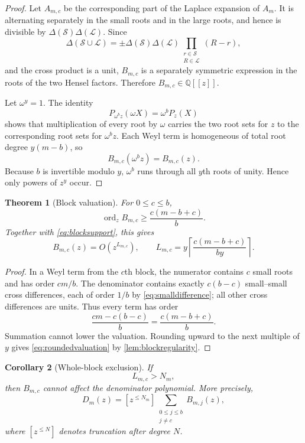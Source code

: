 \documentclass[11pt]{amsart}
\newtheorem{theorem}{Theorem}[section]
\newtheorem{corollary}[theorem]{Corollary}
\theoremstyle{remark}
\newcommand{\Q}{\mathbb{Q}}
\newcommand{\cS}{\mathcal{S}}
\newcommand{\cL}{\mathcal{L}}
\newcommand{\ord}{\operatorname{ord}}
\begin{document}
\begin{proof}
Let $A_{m,c}$ be the corresponding part of the Laplace expansion of $A_m$.  It is alternating separately in the small roots and in the large roots, and hence is divisible by $\Delta(\cS)\Delta(\cL)$.  Since
\[
 \Delta(\cS\cup\cL)
 =\pm\Delta(\cS)\Delta(\cL)
   \prod_{\substack{r\in\cS\\R\in\cL}}(R-r),
\]
and the cross product is a unit, $B_{m,c}$ is a separately symmetric expression in the roots of the two Hensel factors.  Therefore $B_{m,c}\in\Q[[z]]$.

Let $\omega^y=1$.  The identity
\[
    P_{\omega^b z}(\omega X)=\omega^bP_z(X)
\]
shows that multiplication of every root by $\omega$ carries the two root sets for $z$ to the corresponding root sets for $\omega^b z$.  Each Weyl term is homogeneous of total root degree $y(m-b)$, so
\[
    B_{m,c}(\omega^b z)=B_{m,c}(z).
\]
Because $b$ is invertible modulo $y$, $\omega^b$ runs through all $y$th roots of unity.  Hence only powers of $z^y$ occur.
\end{proof}

\begin{theorem}[Block valuation]\label{thm:blockvaluation}
For $0\leq c\leq b$,
\begin{equation}\label{eq:rawvaluation}
    \ord_z B_{m,c}
    \geq\frac{c(m-b+c)}{b}.
\end{equation}
Together with \eqref{eq:blocksupport}, this gives
\begin{equation}\label{eq:roundedvaluation}
    B_{m,c}(z)=O\!\left(z^{L_{m,c}}\right),
    \qquad
    L_{m,c}=y\left\lceil
       \frac{c(m-b+c)}{by}
      \right\rceil.
\end{equation}
\end{theorem}

\begin{proof}
In a Weyl term from the $c$th block, the numerator contains $c$ small roots and has order $cm/b$.  The denominator contains exactly $c(b-c)$ small--small cross differences, each of order $1/b$ by \eqref{eq:smalldifference}; all other cross differences are units.  Thus every term has order
\[
    \frac{cm-c(b-c)}b
    =\frac{c(m-b+c)}b.
\]
Summation cannot lower the valuation.  Rounding upward to the next multiple of $y$ gives \eqref{eq:roundedvaluation} by \cref{lem:blockregularity}.
\end{proof}

\begin{corollary}[Whole-block exclusion]\label{cor:blockexclusion}
If
\begin{equation}\label{eq:blockcriterion}
    L_{m,c}>N_m,
\end{equation}
then $B_{m,c}$ cannot affect the denominator polynomial.  More precisely,
\begin{equation}\label{eq:blocktruncation}
    D_m(z)=
    [z^{\leq N_m}]
    \sum_{\substack{0\leq j\leq b\\j\neq c}}B_{m,j}(z),
\end{equation}
where $[z^{\leq N}]$ denotes truncation after degree $N$.
\end{corollary}
\end{document}
